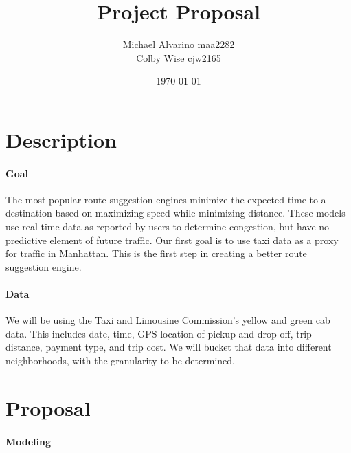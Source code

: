 \documentclass{article}
\begin{document}
\title{\textbf{Project Proposal}}
\date{\today}
\author{
Michael Alvarino maa2282\\
Colby Wise cjw2165
}

\maketitle

\section{Description}

\paragraph{Goal} The most popular route suggestion engines minimize the expected time to a destination based on maximizing speed while minimizing distance. These models use real-time data as reported by users to determine congestion, but have no predictive element of future traffic. Our first goal is to use taxi data as a proxy for traffic in Manhattan. This is the first step in creating a better route suggestion engine.

\paragraph{Data} We will be using the Taxi and Limousine Commission's yellow and green cab data. This includes date, time, GPS location of pickup and drop off, trip distance, payment type, and trip cost. We will bucket that data into different neighborhoods, with the granularity to be determined.

\section{Proposal}

\paragraph{Modeling}
\end{document}
